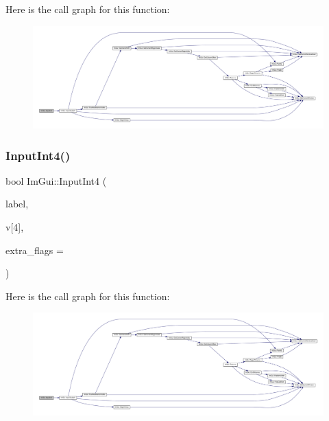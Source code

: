 Here is the call graph for this function\+:
\nopagebreak
\begin{figure}[H]
\begin{center}
\leavevmode
\includegraphics[width=350pt]{namespace_im_gui_ab02fc4a19ed153984d3585296e1c74b1_cgraph}
\end{center}
\end{figure}
\mbox{\label{namespace_im_gui_ac714ecf202c82dc6caa0cbf344c85a13}} 
\subsubsection{\texorpdfstring{Input\+Int4()}{InputInt4()}}
{\footnotesize\ttfamily bool Im\+Gui\+::\+Input\+Int4 (\begin{DoxyParamCaption}\item[{const char $\ast$}]{label,  }\item[{int}]{v\mbox{[}4\mbox{]},  }\item[{\mbox{\hyperlink{imgui_8h_a7d2c6153a6b9b5d3178ce82434ac9fb8}{Im\+Gui\+Input\+Text\+Flags}}}]{extra\+\_\+flags = {} }\end{DoxyParamCaption})}

Here is the call graph for this function\+:
\nopagebreak
\begin{figure}[H]
\begin{center}
\leavevmode
\includegraphics[width=350pt]{namespace_im_gui_ac714ecf202c82dc6caa0cbf344c85a13_cgraph}
\end{center}
\end{figure}
\mbox{\label{namespace_im_gui_a9d6eada4e703c3bf4b2b5e5533a127fd}} 
